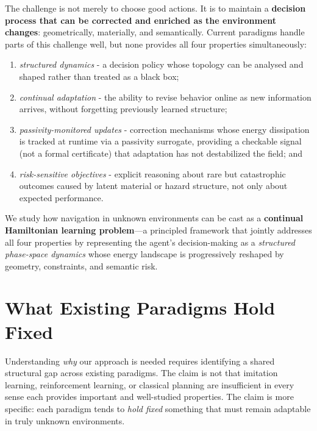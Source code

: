The challenge is not merely to choose good actions.
It is to maintain a \textbf{decision process that can be corrected and enriched
as the environment changes}: geometrically, materially, and semantically.
Current paradigms handle parts of this challenge well, but none provides all
four properties simultaneously:
\begin{enumerate}
  \item \emph{structured dynamics} - a decision policy whose topology can be
        analysed and shaped rather than treated as a black box;
  \item \emph{continual adaptation} - the ability to revise behavior online as
        new information arrives, without forgetting previously learned structure;
  \item \emph{passivity-monitored updates} - correction mechanisms whose
        energy dissipation is tracked at runtime via a passivity surrogate,
        providing a checkable signal (not a formal certificate) that
        adaptation has not destabilized the field; and
  \item \emph{risk-sensitive objectives} - explicit reasoning about rare but
        catastrophic outcomes caused by latent material or hazard structure, not
        only about expected performance.
\end{enumerate}
We study how navigation in unknown environments can be cast as a
\textbf{continual Hamiltonian learning problem}—a principled framework that
jointly addresses all four properties by representing the agent's
decision-making as a \emph{structured phase-space dynamics} whose energy
landscape is progressively reshaped by geometry, constraints, and
semantic risk.

\section{What Existing Paradigms Hold Fixed}
\label{sec:intro:gap}

Understanding \emph{why} our approach is needed requires identifying a shared
structural gap across existing paradigms.
The claim is not that imitation learning, reinforcement learning, or classical
planning are insufficient in every sense each provides important and
well-studied properties.
The claim is more specific: each paradigm tends to \emph{hold fixed} something
that must remain adaptable in truly unknown environments.

